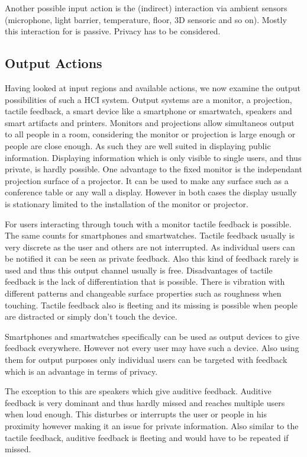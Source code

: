 \documentclass{acm_proc_article-sp}
\begin{document}
Another possible input action is the (indirect) interaction via ambient sensors (microphone, light barrier, temperature, floor, 3D sensoric and so on).
Mostly this interaction for is passive. Privacy has to be considered.

\subsection{Output Actions}

Having looked at input regions and available actions, we now examine the output possibilities of such a HCI system.
Output systems are a monitor, a projection, tactile feedback, a smart device like a smartphone or smartwatch, speakers and smart artifacts and printers.
Monitors and projections allow simultaneos output to all people in a room, considering the monitor or projection is large enough or people are close enough.
As such they are well suited in displaying public information.
Displaying information which is only visible to single users, and thus private, is hardly possible.
One advantage to the fixed monitor is the independant projection surface of a projector.
It can be used to make any surface such as a conference table or any wall a display.
However in both cases the display usually is stationary limited to the installation of the monitor or projector.

For users interacting through touch with a monitor tactile feedback is possible.
The same counts for smartphones and smartwatches.
Tactile feedback usually is very discrete as the user and others are not interrupted.
As individual users can be notified it can be seen as private feedback.
Also this kind of feedback rarely is used and thus this output channel usually is free.
Disadvantages of tactile feedback is the lack of differentiation that is possible.
There is vibration with different patterns and changeable surface properties such as roughness when touching.
Tactile feedback also is fleeting and its missing is possible when people are distracted or simply don’t touch the device.

Smartphones and smartwatches specifically can be used as output devices to give feedback everywhere.
However not every user may have such a device.
Also using them for output purposes only individual users can be targeted with feedback which is an advantage in terms of privacy.

The exception to this are speakers which give auditive feedback.
Auditive feedback is very dominant and thus hardly missed and reaches multiple users when loud enough.
This disturbes or interrupts the user or people in his proximity however making it an issue for private information.
Also similar to the tactile feedback, auditive feedback is fleeting and would have to be repeated if missed.
\end{document}
